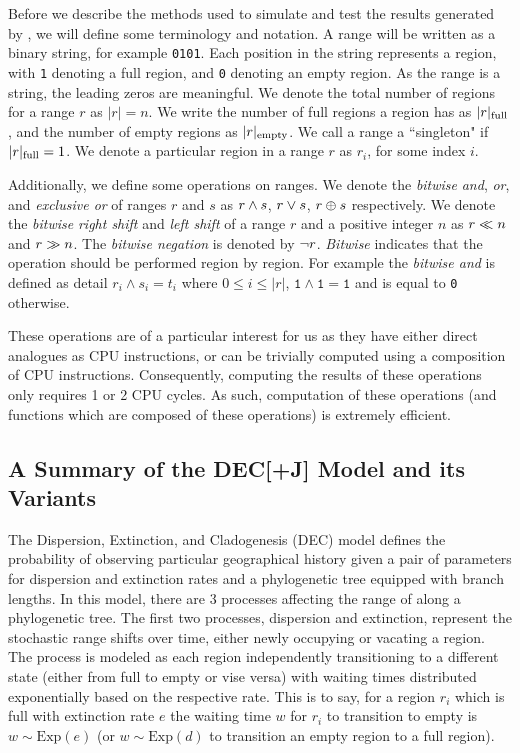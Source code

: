 \documentclass{article}
\begin{document}
Before we describe the methods used to simulate and test the results generated
by \bigrig{}, we will define some terminology and notation.
A range will be written as a binary string, for example \texttt{0101}.
Each position in the string represents a region, with \texttt{1} denoting a full
region, and \texttt{0} denoting an empty region.
As the range is a string, the leading zeros are meaningful.
We denote the total number of regions for a range \( r \) as \( |r| = n\).
We write the number of full regions a region has as \( |r|_\text{full} \), and the
number of empty regions as \( |r|_\text{empty} \).
We call a range a ``singleton" if $|r|_\text{full} = 1$.
We denote a particular region in a range $r$ as $r_i$, for some index $i$.

Additionally, we define some operations on ranges.
We denote the \textit{bitwise} \textit{and}, \textit{or}, and \textit{exclusive
or} of ranges $r$ and $s$ as $r \land s$, $r \lor s$, $r \oplus s$
respectively.
We denote the \textit{bitwise} \textit{right shift} and \textit{left shift} of a
range $r$ and a positive integer $n$ as $r \ll n$ and $r \gg n$.
The \textit{bitwise negation} is denoted by $\neg r$.
\textit{Bitwise} indicates that the operation should be performed
region by region. 
For example the \textit{bitwise and} is defined as detail $r_i \land s_i = t_i$
where $0 \leq i \leq |r|$, $\texttt{1} \land \texttt{1} = \texttt{1}$ and is
equal to \texttt{0} otherwise.

These operations are of a particular interest for us as they have either direct
analogues as CPU instructions, or can be trivially computed using a composition
of CPU instructions.
Consequently, computing the results of these operations only requires 1 or 2 CPU
cycles. 
As such, computation of these operations (and functions which are composed of
these operations) is extremely efficient.

\subsection{A Summary of the DEC[+J] Model and its Variants} \label{sec:model}

The Dispersion, Extinction, and Cladogenesis (DEC) model defines the probability
of observing particular geographical history given a pair of parameters for
dispersion and extinction rates and a phylogenetic tree equipped with branch
lengths. 
In this model, there are 3 processes affecting the range of along a phylogenetic
tree.
The first two processes, dispersion and extinction, represent the stochastic
range shifts over time, either newly occupying or vacating a region.
The process is modeled as each region independently transitioning to a
different state (either from full to empty or vise versa) with waiting times
distributed exponentially based on the respective rate.
This is to say, for a region \( r_i \) which is full with extinction
rate \( e \) the waiting time \( w \) for \( r_i \) to transition to empty is \(
w \sim \text{Exp}(e) \) (or $w \sim \text{Exp}(d)$ to transition an empty region
to a full region).
\end{document}
